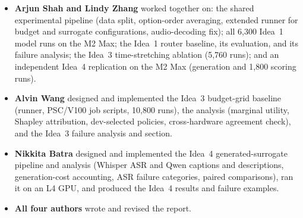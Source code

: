 \documentclass{article}
\begin{document}
\begin{itemize}
  \item \textbf{Arjun Shah and Lindy Zhang} worked together on: the shared
    experimental pipeline (data split, option-order averaging, extended runner for
    budget and surrogate configurations, audio-decoding fix); all 6,300 Idea~1 model
    runs on the M2 Max; the Idea~1 router baseline, its evaluation, and its failure
    analysis; the Idea~3 time-stretching ablation (5,760 runs); and an independent
    Idea~4 replication on the M2 Max (generation and 1,800 scoring runs).
  \item \textbf{Alvin Wang} designed and implemented the Idea~3 budget-grid baseline
    (runner, PSC/V100 job scripts, 10,800 runs), the analysis (marginal utility,
    Shapley attribution, dev-selected policies, cross-hardware agreement check), and
    the Idea~3 failure analysis and section.
  \item \textbf{Nikkita Batra} designed and implemented the Idea~4 generated-surrogate
    pipeline and analysis (Whisper ASR and Qwen captions and descriptions,
    generation-cost accounting, ASR failure categories, paired comparisons), ran it
    on an L4 GPU, and produced the Idea~4 results and failure examples.
  \item \textbf{All four authors} wrote and revised the report.
\end{itemize}
\end{document}
